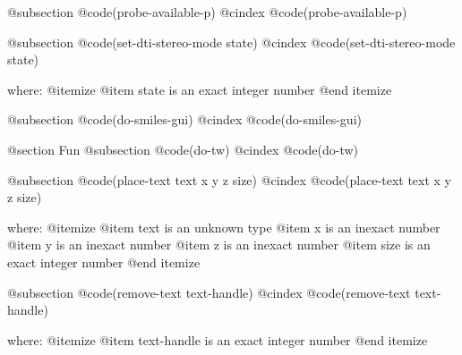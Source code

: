 @subsection @code{(probe-available-p)}
@cindex @code{(probe-available-p)}
 
@subsection @code{(set-dti-stereo-mode state)}
@cindex @code{(set-dti-stereo-mode state)}
 
where: 
 @itemize 
     @item state is an exact integer number
 @end itemize


@subsection @code{(do-smiles-gui)}
@cindex @code{(do-smiles-gui)}
 

@section Fun 
@subsection @code{(do-tw)}
@cindex @code{(do-tw)}
 
@subsection @code{(place-text text x y z size)}
@cindex @code{(place-text text x y z size)}
 
where: 
 @itemize 
     @item text is an unknown type
     @item x is an inexact number
     @item y is an inexact number
     @item z is an inexact number
     @item size is an exact integer number
 @end itemize


@subsection @code{(remove-text text-handle)}
@cindex @code{(remove-text text-handle)}
 
where: 
 @itemize 
     @item text-handle is an exact integer number
 @end itemize


